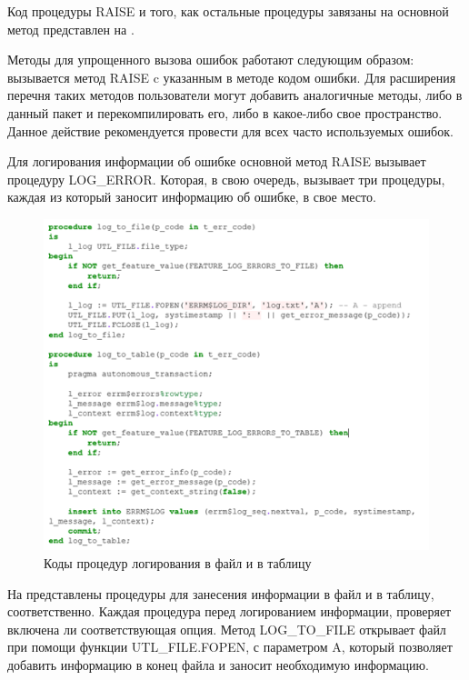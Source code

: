 Код процедуры RAISE и того, как остальные процедуры завязаны на основной метод представлен на . 

Методы для упрощенного вызова ошибок работают следующим образом: вызывается метод RAISE c указанным в методе кодом ошибки. Для расширения перечня таких методов пользователи могут добавить аналогичные методы, либо в данный пакет и перекомпилировать его, либо в какое-либо свое пространство. Данное действие рекомендуется провести для всех часто используемых ошибок. 

Для логирования информации об ошибке основной метод RAISE вызывает процедуру LOG\_ERROR. Которая, в свою очередь, вызывает три процедуры, каждая из который заносит информацию об ошибке, в свое место. 

\begin{figure}[ht!] 
	\center
	\includegraphics [scale=1] {my_folder/img/c3_log_to_file_code.png}
	\caption{Коды процедур логирования в файл и в таблицу} 
	\label{fig:c3_log_to_file_code}  
\end{figure}
\FloatBarrier

На  представлены процедуры для занесения информации в файл и в таблицу, соответственно. Каждая процедура перед логированием информации, проверяет включена ли соответствующая опция. Метод LOG\_TO\_FILE открывает файл при помощи функции UTL\_FILE.FOPEN, с параметром A, который позволяет добавить информацию в конец файла и заносит необходимую информацию. 

